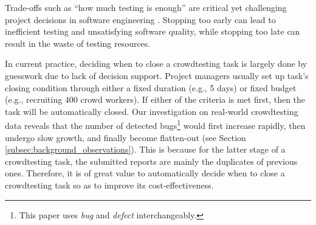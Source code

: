 \documentclass[sigconf,review, anonymous]{acmart}
\begin{document}
Trade-offs such as ``how much testing is enough'' are critical yet challenging project decisions in software engineering \cite{myers2011art,lewis2016software,garg2011stop,iqbal2013software}.
Stopping too early can lead to inefficient testing and unsatisfying software quality, while stopping too late can result in the waste of testing resources.

In current practice, deciding when to close a crowdtesting task is largely done by guesswork due to lack of decision support. %
Project managers usually set up task's closing condition through either a fixed duration (e.g., 5 days) or fixed budget (e.g., recruiting 400 crowd workers).
If either of the criteria is met first, then the task will be automatically closed.
Our investigation on real-world crowdtesting data reveals that the number of detected bugs\footnote{This paper uses \textit{bug} and \textit{defect} interchangeably.} would first increase rapidly, then undergo slow growth, and finally become flatten-out (see Section \ref{subsec:background_observations}).
This is because for the latter stage of a crowdtesting task, the submitted reports are mainly the duplicates of previous ones.
Therefore, it is of great value to automatically decide when to close a crowdtesting task so as to improve its cost-effectiveness.

\end{document}
